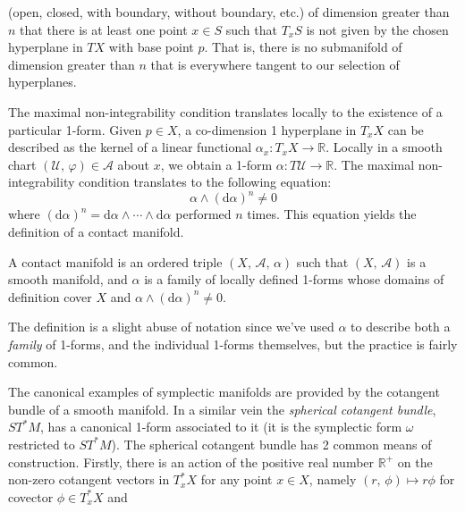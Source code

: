     (open, closed, with boundary, without boundary, etc.)
    of dimension greater than $n$ that there is at least one point
    $x\in{S}$ such that $T_{x}S$ is not given by the chosen hyperplane in $TX$
    with base point $p$. That is, there is no submanifold of dimension greater
    than $n$ that is everywhere tangent to our selection of hyperplanes.
    \par\hfill\par
    The maximal non-integrability condition translates locally to the existence
    of a particular 1-form. Given $p\in{X}$, a co-dimension 1 hyperplane in
    $T_{x}X$ can be described as the kernel of a linear functional
    $\alpha_{x}:T_{x}X\rightarrow\mathbb{R}$. Locally in a smooth chart
    $(\mathcal{U},\,\varphi)\in\mathcal{A}$ about $x$, we obtain a 1-form
    $\alpha:T\mathcal{U}\rightarrow\mathbb{R}$. The maximal non-integrability
    condition translates to the following equation:
    \begin{equation}
        \alpha\land(\textrm{d}\alpha)^{n}\ne{0}
    \end{equation}
    where
    $(\textrm{d}\alpha)^{n}=\textrm{d}\alpha\land\cdots\land\textrm{d}\alpha$
    performed $n$ times. This equation yields the definition of a contact
    manifold.
    \begin{definition}
        A contact manifold is an ordered triple $(X,\,\mathcal{A},\,\alpha)$
        such that $(X,\,\mathcal{A})$ is a smooth manifold, and
        $\alpha$ is a family of locally defined 1-forms whose domains of
        definition cover $X$ and $\alpha\land(\textrm{d}\alpha)^{n}\ne{0}$.
    \end{definition}
    The definition is a slight abuse of notation since we've used $\alpha$ to
    describe both a \textit{family} of 1-forms, and the individual 1-forms
    themselves, but the practice is fairly common.
    \par\hfill\par
    The canonical examples of symplectic manifolds are provided by the
    cotangent bundle of a smooth manifold. In a similar vein the
    \textit{spherical cotangent bundle}, $ST^{*}M$, has a canonical
    1-form associated to it (it is the symplectic form $\omega$ restricted to
    $ST^{*}M$). The spherical cotangent bundle has 2 common means
    of construction. Firstly, there is an action of the positive
    real number $\mathbb{R}^{+}$ on the non-zero cotangent vectors in
    $T^{*}_{x}X$ for any point $x\in{X}$, namely
    $(r,\,\phi)\mapsto{r}\phi$ for covector $\phi\in{T}^{*}_{x}X$ and
